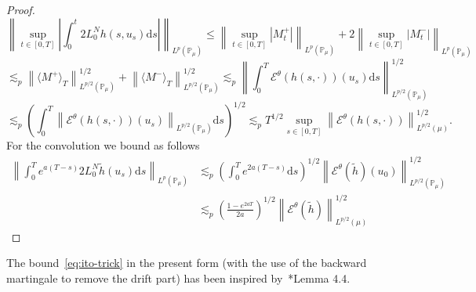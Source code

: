\documentclass[11pt,a4paper,reqno]{amsart}
\newcommand{\PP}{\mathbb{P}}
\newcommand{\cE}{\mathcal{E}}
\newcommand{\dd}{\mathrm{d}}
\begin{document}
\begin{proof}
$$
\left\|\sup_{t\in[0,T]}\left|\int_0^t  2 L_0^N h(s,u_s) \dd s\right|\right\|_{L^p(\PP_\mu)} \le
\left\|\sup_{t\in[0,T]}|M^+_t| \right\|_{L^p(\PP_\mu)}+
2 \left\|\sup_{t\in[0,T]}|M^-_t| \right\|_{L^p(\PP_\mu)}
$$
$$
\lesssim_p \left\| \langle M^+\rangle_T  \right\|_{L^{p/2}(\PP_\mu)}^{1/2}+\left\| \langle M^-\rangle_T  \right\|_{L^{p/2}(\PP_\mu)}^{1/2}
\lesssim_p \left\|\int_0^T \cE^\theta(h(s,\cdot))(u_s) \dd s \right\|_{L^{p/2}(\PP_\mu)}^{1/2}
$$
$$
\lesssim_p \left(\int_0^T\left\| \cE^\theta(h(s,\cdot))(u_s) \right\|_{L^{p/2}(\PP_\mu)} \dd s\right)^{1/2}
\lesssim_p T^{1/2} \sup_{s\in[0,T]} \left\| \cE^\theta(h(s,\cdot)) \right\|_{L^{p/2}(\mu)}^{1/2} .
$$
For the convolution we bound as follows
\begin{equation*}
\begin{split}
\left\|\int_0^T e^{a(T-s)} 2 L_0^N \tilde h(u_s) \dd s\right\|_{L^p(\PP_\mu)} 
&  \lesssim_p \left(\int_0^T e^{2a(T-s)}\dd s\right)^{1/2} 
 \left\| \cE^\theta(\tilde h)(u_0) \right\|^{1/2}_{L^{p/2}(\PP_\mu)} 
 \\ &  \lesssim_p
 \left(\frac{1-e^{2aT}}{2a}\right)^{1/2} 
 \left\| \cE^\theta(\tilde h) \right\|^{1/2}_{L^{p/2}(\mu)}
 \end{split}
\end{equation*}
\end{proof}
The bound~\eqref{eq:ito-trick} in the present form (with the use of the backward martingale to remove the drift part) has been inspired by~\cite{CLO}*{Lemma 4.4}.
\end{document}

